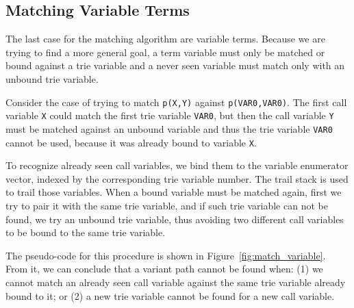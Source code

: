 \subsection{Matching Variable Terms}

The last case for the matching algorithm are variable terms. Because we are trying to find a more general goal,
a term variable must only be matched or bound against a trie variable and a
never seen variable must match only with an unbound trie variable.

Consider the case of trying to match \texttt{p(X,Y)} against \texttt{p(VAR0,VAR0)}.
The first call variable \texttt{X} could match the first trie variable \texttt{VAR0},
but then the call variable \texttt{Y} must be matched against an unbound variable and
thus the trie variable \texttt{VAR0} cannot be used, because it
was already bound to variable \texttt{X}.

To recognize already seen call variables, we bind them to the variable enumerator vector, indexed
by the corresponding trie variable number. The trail stack is used to trail those variables.
When a bound variable must be matched again, first we try to pair it with the same trie variable,
and if such trie variable can not be found, we try an unbound trie variable, thus
avoiding two different call variables to be bound to the same trie variable.

The pseudo-code for this procedure is shown in Figure~\ref{fig:match_variable}.
From it, we can conclude that a variant path
cannot be found when:
(1) we cannot match an already seen call variable against the same trie variable already bound to it;
or (2) a new trie variable cannot be found for a new call variable.

